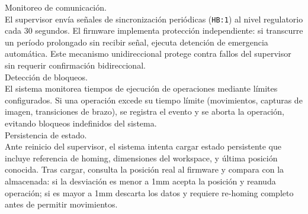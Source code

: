 Monitoreo de comunicación.\\
\noindent
El supervisor envía señales de sincronización periódicas (\texttt{HB:1}) al nivel regulatorio cada 30 segundos. El firmware implementa protección independiente: si transcurre un período prolongado sin recibir señal, ejecuta detención de emergencia automática. Este mecanismo unidireccional protege contra fallos del supervisor sin requerir confirmación bidireccional.\\

Detección de bloqueos.\\
\noindent El sistema monitorea tiempos de ejecución de operaciones mediante límites configurados. Si una operación excede su tiempo límite (movimientos, capturas de imagen, transiciones de brazo), se registra el evento y se aborta la operación, evitando bloqueos indefinidos del sistema.\\

Persistencia de estado.\\
\noindent Ante reinicio del supervisor, el sistema intenta cargar estado persistente que incluye referencia de homing, dimensiones del workspace, y última posición conocida. Tras cargar, consulta la posición real al firmware y compara con la almacenada: si la desviación es menor a 1mm acepta la posición y reanuda operación; si es mayor a 1mm descarta los datos y requiere re-homing completo antes de permitir movimientos.
